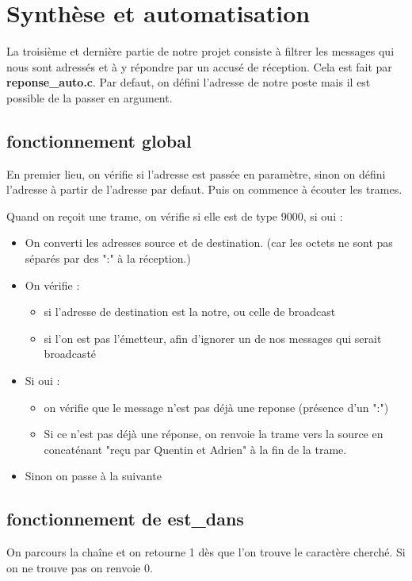 \documentclass[a4paper,11pt]{article}
\begin{document}
	\section{Synthèse et automatisation}
	
	La troisième et dernière partie de notre projet consiste à filtrer les messages qui nous sont adressés et à y répondre par un accusé de réception. Cela est fait par \textbf{reponse\_auto.c}. Par defaut, on défini l'adresse de notre poste mais il est possible de la passer en argument.
	\subsection{fonctionnement global}
	En premier lieu, on vérifie si l'adresse est passée en paramètre, sinon on défini l'adresse à partir de l'adresse par defaut. 
	Puis on commence à écouter les trames.

	Quand on reçoit une trame, on vérifie si elle est de type 9000, si oui : 
	\begin{itemize}
	\item On converti les adresses source et de destination. (car les octets ne sont pas séparés par des ":" à la réception.)
	\item On vérifie : 
		\begin{itemize}
		\item si l'adresse de destination est la notre, ou celle de broadcast
		\item si l'on est pas l'émetteur, afin d'ignorer un de nos messages qui serait broadcasté
		\end{itemize}
	\item Si oui :
		\begin{itemize}
		\item on vérifie que le message n'est pas déjà une reponse (présence d'un ":")
		\item Si ce n'est pas déjà une réponse, on renvoie la trame vers la source en concaténant "reçu par Quentin et Adrien" à la fin de la trame.
	\end{itemize}
	\item Sinon on passe à la suivante
	\end{itemize}

	\subsection{fonctionnement de est\_dans}
	On parcours la chaîne et on retourne 1 dès que l'on trouve le caractère cherché. Si on ne trouve pas on renvoie 0.
	
\end{document}
